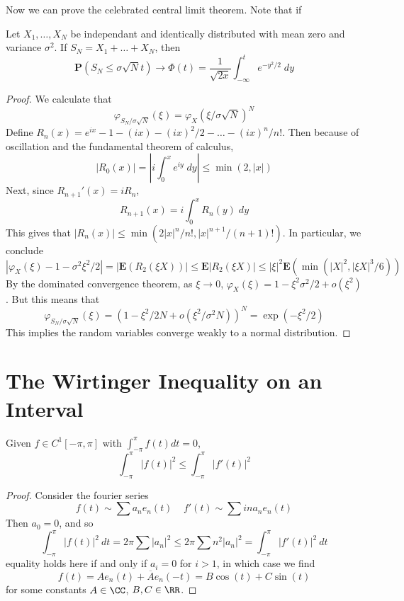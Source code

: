 Now we can prove the celebrated central limit theorem. Note that if

\begin{theorem}
    Let $X_1, \dots, X_N$ be independant and identically distributed with mean zero and variance $\sigma^2$. If $S_N = X_1 + \dots + X_N$, then
    \[ \mathbf{P}(S_N \leq \sigma \sqrt{N} t) \to \Phi(t) = \frac{1}{\sqrt{2x}} \int_{-\infty}^t e^{-y^2/2}\; dy \]
\end{theorem}
\begin{proof}
    We calculate that
    \[ \varphi_{S_N/\sigma \sqrt{N}}(\xi) = \varphi_X(\xi/\sigma \sqrt{N})^N \]
    Define $R_n(x) = e^{ix} - 1 - (ix) - (ix)^2/2 - \dots - (ix)^n/n!$. Then because of oscillation and the fundamental theorem of calculus,
    \[ |R_0(x)| = \left| i \int_0^x e^{iy}\; dy \right| \leq \min(2,|x|) \]
    Next, since $R_{n+1}'(x) = i R_n$,
    \[ R_{n+1}(x) = i  \int_0^x R_n(y)\; dy \]
    This gives that $|R_n(x)| \leq \min(2|x|^n/n!,|x|^{n+1}/(n+1)!)$. In particular, we conclude
    \[ |\varphi_X(\xi) - 1 - \sigma^2 \xi^2/2| = |\mathbf{E}(R_2(\xi X))| \leq \mathbf{E}|R_2(\xi X)| \leq |\xi|^2 \mathbf{E} \left( \min \left( |X|^2, |\xi X|^3/6 \right) \right) \]
    By the dominated convergence theorem, as $\xi \to 0$, $\varphi_X(\xi) = 1 - \xi^2 \sigma^2/2 + o(\xi^2)$. But this means that
    \[ \varphi_{S_N/\sigma \sqrt{N}}(\xi) = (1 - \xi^2 / 2 N + o(\xi^2/\sigma^2 N))^N = \exp(-\xi^2/2) \]
    This implies the random variables converge weakly to a normal distribution.
\end{proof}


\section{The Wirtinger Inequality on an Interval}

\begin{theorem}
    Given $f \in C^1[-\pi,\pi]$ with $\int_{-\pi}^\pi f(t) dt = 0$,
    \[ \int_{-\pi}^\pi |f(t)|^2 \leq \int_{-\pi}^\pi |f'(t)|^2 \]
\end{theorem}
\begin{proof}
    Consider the fourier series
    \[ f(t) \sim \sum a_n e_n(t)\ \ \ \ \ f'(t) \sim \sum in a_n e_n(t) \]
    Then $a_0 = 0$, and so
    \[ \int_{-\pi}^\pi |f(t)|^2\ dt = 2 \pi \sum |a_n|^2 \leq 2 \pi \sum n^2 |a_n|^2 = \int_{-\pi}^\pi |f'(t)|^2\ dt \]
    equality holds here if and only if $a_i = 0$ for $i > 1$, in which case we find
    \[ f(t) = A e_n(t) + \overline{A} e_n(-t) = B \cos(t) + C \sin(t) \]
    for some constants $A \in \CC$, $B,C \in \RR$.
\end{proof}

